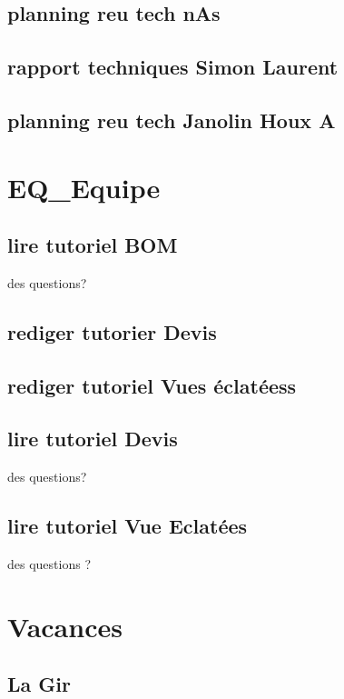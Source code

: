 	\subsection*{planning reu tech nAs} 
 \par 
	\subsection*{rapport techniques Simon Laurent} 
 \par 
	\subsection*{planning reu tech Janolin Houx A} 
 \par 
\newpage 
 \section*{EQ\_Equipe} 
 \par 
	\subsection*{lire tutoriel BOM} 
 \par des questions?
	\subsection*{rediger tutorier Devis} 
 \par 
	\subsection*{rediger tutoriel Vues éclatéess} 
 \par 
	\subsection*{lire tutoriel Devis} 
 \par des questions?
	\subsection*{lire tutoriel Vue Eclatées} 
 \par des questions ?
\newpage 
 \section*{Vacances} 
 \par 
	\subsection*{La Gir} 
 \par 
